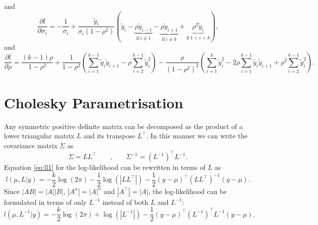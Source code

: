 \documentclass{article}
\begin{document}
%
and
%
\begin{equation}
  \frac{\partial l}{\partial \sigma_i} = - \frac{1}{\sigma_i} + \frac{\tilde{y}_i}{\sigma_i(1-\rho^2)}
  \left( \tilde{y}_i
         - \underbrace{\rho\tilde{y}_{i-1}}_{\text{if} \: i \neq 1}
         - \underbrace{\rho\tilde{y}_{i+1}}_{\text{if} \: i \neq k}
         + \underbrace{\rho^2\tilde{y}_i}_{\text{if} \: 1 < i < k}
  \right),
\end{equation}
%
and
%
\begin{equation}
  \frac{\partial l}{\partial \rho}
  = \frac{(k-1)\rho}{1-\rho^2}
  + \frac{1}{1-\rho^2} \left( \sum_{i=1}^{k-1} \tilde{y}_i \tilde{y}_{i+1} - \rho \sum_{i=2}^{k-1} \tilde{y}_i^2  \right)
  - \frac{\rho}{(1-\rho^2)^2} \left( \sum_{i=1}^{k} \tilde{y}_i^2 - 2\rho \sum_{i=1}^{k-1} \tilde{y}_i \tilde{y}_{i+1} + \rho^2 \sum_{i=2}^{k-1} \tilde{y}_i^2 \right).
\end{equation}


\newpage
\section{Cholesky Parametrisation}

Any symmetric positive definite matrix can be decomposed as the product of a
lower triangular matrix $L$ and its transpose $L^\top$. In this manner 
we can write the covariance matrix $\Sigma$ as
%
\begin{equation}
 \Sigma = L L^\top
 \qquad \text{,} \qquad
 \Sigma^{-1} = (L^{-1})^\top L^{-1}.
\end{equation}
%
Equation \ref{eq:ll1} for the log-likelihood can be rewritten in terms of $L$ as 
%
\begin{equation}
 l(\mu, L|y) = -\frac{k}{2}\log(2\pi) - \frac{1}{2}\log(|L L^\top|) - \frac{1}{2} (y-\mu)^\top 
	(L L^\top)^{-1} (y-\mu).
 \label{eq:ll_chol}
\end{equation}
%
Since $|A B| = |A| |B|$, $|A^n| = |A|^n$ and $|A^\top| = |A|$, the 
log-likelihood can be formulated in terms of only $L^{-1}$ instead of 
both $L$ and $L^{-1}$:
%
\begin{equation}
	l(\mu, L^{-1}|y) = -\frac{k}{2}\log(2\pi) + \log(|L^{-1}|) 
	- \frac{1}{2} (y-\mu)^\top (L^{-1})^\top L^{-1} (y-\mu).
 \label{eq:ll_choles}
\end{equation}
%
\end{document}
